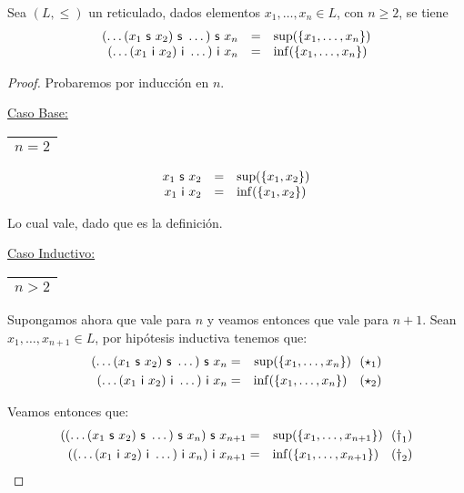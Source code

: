   \begin{lemma} \label{lemma_3}
    \PN Sea $(L, \leq)$ un reticulado, dados elementos $x_{1}, \dotsc, x_{n} \in L$, con $n \geq 2$, se tiene
    \[
      \begin{array}{rcl}
        (\dotsc (x_{1} \ \mathsf{s} \ x_{2}) \ \mathsf{s} \ \dotsc) \ \mathsf{s} \ x_{n} &=& \sup (\{x_{1}, \dotsc, x_{n}\}) \\
        (\dotsc (x_{1} \ \mathsf{i} \ x_{2}) \ \mathsf{i} \ \dotsc) \ \mathsf{i} \ x_{n} &=& \inf (\{x_{1}, \dotsc, x_{n}\})
      \end{array}
    \]
  \end{lemma}
  \begin{proof}
    \PN Probaremos por inducción en $n$.

    \vspace{3mm}
    \PN \underline{Caso Base:} \begin{tabular}{|c|} \hline $n = 2$ \\\hline \end{tabular}
    \[
      \begin{array}{rcl}
        x_{1} \ \mathsf{s} \ x_{2} &=& \sup(\{x_{1}, x_{2}\}) \\
        x_{1} \ \mathsf{i} \ x_{2} &=& \inf(\{x_{1}, x_{2}\})
      \end{array}
    \]

    \PN Lo cual vale, dado que es la definición.

    \vspace{3mm}
		\PN \underline{Caso Inductivo:} \begin{tabular}{|c|} \hline $n > 2$ \\\hline \end{tabular}

    \PN Supongamos ahora que vale para $n$ y veamos entonces que vale para $n+1$. Sean $x_{1}, \dotsc, x_{n+1} \in L$,
    por hipótesis inductiva tenemos que:
    \begin{eqnarray*}
      (\dotsc (x_{1} \ \mathsf{s} \ x_{2}) \ \mathsf{s} \ \dotsc) \ \mathsf{s} \ x_{n} &=& \sup(\{x_{1}, \dotsc, x_{n}\}) \ \ (\star_{1}) \\
      (\dotsc (x_{1} \ \mathsf{i} \ x_{2}) \ \mathsf{i} \ \dotsc) \ \mathsf{i} \ x_{n} &=& \inf(\{x_{1}, \dotsc, x_{n}\}) \ \ \ (\star_{2})
    \end{eqnarray*}


    \PN Veamos entonces que:
    \begin{eqnarray*}
      ((\dotsc(x_{1} \ \mathsf{s} \ x_{2}) \ \mathsf{s} \ \dotsc) \ \mathsf{s} \ x_{n}) \ \mathsf{s} \ x_{n+1} &=& \sup(\{x_{1}, \dotsc, x_{n+1}\})
        \ \ (\dag_{1}) \\
      ((\dotsc(x_{1} \ \mathsf{i} \ x_{2}) \ \mathsf{i} \ \dotsc) \ \mathsf{i} \ x_{n}) \ \mathsf{i} \ x_{n+1} &=& \inf(\{x_{1}, \dotsc, x_{n+1}\})
        \ \ \ (\dag_{2})
    \end{eqnarray*}


\end{proof}
